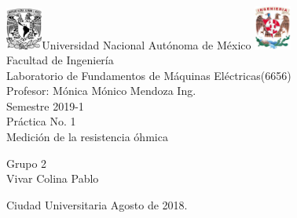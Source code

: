 

\begin{titlepage}
     \begin{center}
	\includegraphics[width=0.09\textwidth]{UNAM}\Large Universidad Nacional Autónoma de México
        	\includegraphics[width=0.09\textwidth]{FI}\\[2cm]
        \Large Facultad de Ingeniería\\[2cm]
         \Large Laboratorio de Fundamentos de Máquinas Eléctricas(6656)\\[2cm]
         \footnotesize Profesor: 
         Mónica Mónico Mendoza Ing.\\[2cm]
        \footnotesize Semestre 2019-1\\[2cm]
        
       

        \Large Práctica No. 1\\[2cm]
        
           

\Large Medición de la resistencia óhmica
        
          \begin{flushright}
\footnotesize  Grupo 2\\[1cm]
\footnotesize Vivar Colina Pablo\\[0.5cm]
 \end{flushright}
          \begin{flushleft}
        \footnotesize Ciudad Universitaria Agosto de 2018.\\
          \end{flushleft}
         
          
   \end{center}
\end{titlepage}
